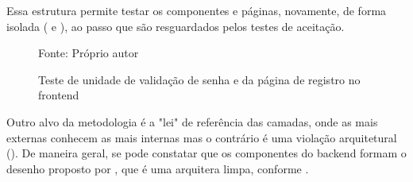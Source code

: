   Essa estrutura permite testar os componentes e páginas, novamente, de forma isolada ( e ), ao passo que são resguardados pelos testes de aceitação.

  \begin{figure}[h]
    \centering
    \caption{Teste de unidade de validação de senha e da página de registro no frontend}
    \small{Fonte: Próprio autor}
    \label{fig:testes-de-unidade-validacao-senha}
  \end{figure}

  Outro alvo da metodologia é a "lei" de referência das camadas, onde as mais externas conhecem as mais internas mas o contrário é uma violação arquitetural (). De maneira geral, se pode constatar que os componentes do backend formam o desenho proposto por , que é uma arquitera limpa, conforme .

